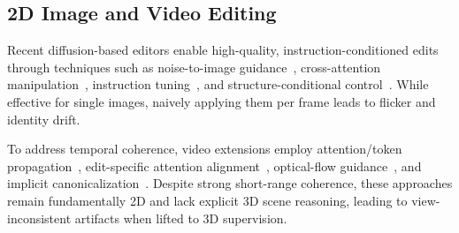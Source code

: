 \documentclass[10pt,twocolumn,letterpaper]{article}
\begin{document}
\subsection{2D Image and Video Editing}
Recent diffusion-based editors enable high-quality, instruction-conditioned edits through techniques such as noise-to-image guidance~\cite{meng2022sdeditguidedimagesynthesis}, cross-attention manipulation~\cite{hertz2022prompttopromptimageeditingcross}, instruction tuning~\cite{ip2p}, and structure-conditional control~\cite{controlnet}. While effective for single images, naively applying them per frame leads to flicker and identity drift.

To address temporal coherence, video extensions employ attention/token propagation~\cite{geyer2023tokenflowconsistentdiffusionfeatures}, edit-specific attention alignment~\cite{qi2023fatezerofusingattentionszeroshot,liu2023videop2pvideoeditingcrossattention}, optical-flow guidance~\cite{yang2023rerendervideozeroshottextguided}, and implicit canonicalization~\cite{ouyang2024codefcontentdeformationfields}. Despite strong short-range coherence, these approaches remain fundamentally 2D and lack explicit 3D scene reasoning, leading to view-inconsistent artifacts when lifted to 3D supervision.
\end{document}
